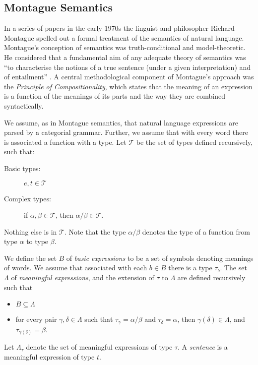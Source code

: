 \documentclass{svmult}
\begin{document}
\subsection{Montague Semantics}

In a series of papers in the early 1970s \cite{Montague1970a,Montague1970b,Montague1973} the linguist and philosopher Richard Montague spelled out a formal treatment of the semantics of natural language. Montague's conception of semantics was truth-conditional and model-theoretic. He considered that a fundamental aim of any adequate theory of semantics was ``to characterise the notions of a true sentence (under a given interpretation) and of entailment'' \cite{Montague1970b}. A central methodological component of Montague's approach was the {\em Principle of Compositionality\/}, which states that the meaning of an expression is a function of the meanings of its parts and the way they are combined syntactically.


We assume, as in Montague semantics, that natural language expressions
are parsed by a categorial grammar. Further, we assume that with every word there is
associated a function with a type. Let $\mathcal{T}$ be the set of types defined
recursively, such that:
\begin{description}
\item [Basic types:] $e,t\in \mathcal{T}$
\item[Complex types:]  if $\alpha, \beta\in \mathcal{T}$, then $\alpha/\beta\in \mathcal{T}$.
\end{description}
Nothing else is in $\mathcal{T}$. Note that the type $\alpha/\beta$ denotes the type of a function from type
$\alpha$ to type $\beta$.

We define the set $B$ of \emph{basic expressions} to be a set of
symbols denoting meanings of words. We assume that associated with
each $b\in B$ there is a type $\tau_b$. The set $\Lambda$ of
\emph{meaningful expressions}, and the extension of $\tau$ to $\Lambda$ are
defined recursively such that
\begin{itemize}
\item $B\subseteq \Lambda$
\item for every pair $\gamma,\delta\in \Lambda$ such that $\tau_\gamma
  = \alpha/\beta$ and $\tau_\delta = \alpha$, then $\gamma(\delta)\in
  \Lambda$, and $\tau_{\gamma(\delta)} = \beta$.
\end{itemize}
Let $\Lambda_\tau$ denote the set of meaningful expressions of type
$\tau$. A \emph{sentence} is a meaningful expression of type $t$.
\end{document}
